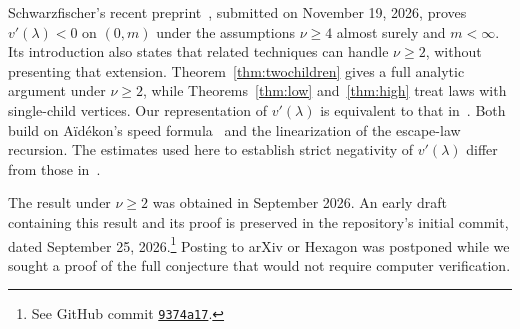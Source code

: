 \begin{remark}\label{rem:concurrent-work}
Schwarzfischer's recent preprint~\cite{Schwarzfischer}, submitted on November 19, 2026, proves $v'(\lambda)<0$ on $(0,m)$ under the assumptions $\nu\ge4$ almost surely and $m<\infty$. Its introduction also states that related techniques can handle $\nu\ge2$, without presenting that extension. Theorem~\ref{thm:twochildren} gives a full analytic argument under $\nu\ge2$, while Theorems~\ref{thm:low} and~\ref{thm:high} treat laws with single-child vertices. Our representation of $v'(\lambda)$ is equivalent to that in~\cite[Proposition~2.9]{Schwarzfischer}. Both build on A\"id\'ekon's speed formula~\cite{Aidekon} and the linearization of the escape-law recursion. The estimates used here to establish strict negativity of $v'(\lambda)$ differ from those in~\cite{Schwarzfischer}.

The result under $\nu\ge2$ was obtained in September 2026. An early draft containing this result and its proof is preserved in the repository's initial commit, dated September 25, 2026.\footnote{See GitHub commit \href{https://github.com/hengmamath/monotone-speed-biased-RW/commit/9374a17682392e39152f1f39f8e7193ef8365c97}{\texttt{9374a17}}.} Posting to arXiv or Hexagon was postponed while we sought a proof of the full conjecture that would not require computer verification.
\end{remark}

